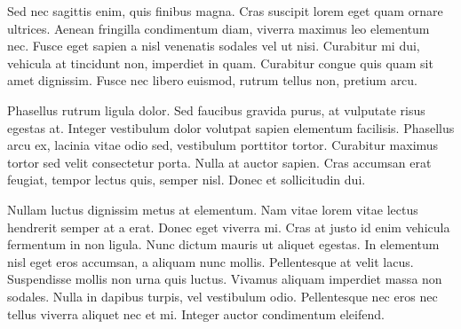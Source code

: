 Sed nec sagittis enim, quis finibus magna. Cras suscipit lorem eget quam ornare ultrices. Aenean fringilla condimentum diam, viverra maximus leo elementum nec. Fusce eget sapien a nisl venenatis sodales vel ut nisi. Curabitur mi dui, vehicula at tincidunt non, imperdiet in quam. Curabitur congue quis quam sit amet dignissim. Fusce nec libero euismod, rutrum tellus non, pretium arcu.

Phasellus rutrum ligula dolor. Sed faucibus gravida purus, at vulputate risus egestas at. Integer vestibulum dolor volutpat sapien elementum facilisis. Phasellus arcu ex, lacinia vitae odio sed, vestibulum porttitor tortor. Curabitur maximus tortor sed velit consectetur porta. Nulla at auctor sapien. Cras accumsan erat feugiat, tempor lectus quis, semper nisl. Donec et sollicitudin dui.

Nullam luctus dignissim metus at elementum. Nam vitae lorem vitae lectus hendrerit semper at a erat. Donec eget viverra mi. Cras at justo id enim vehicula fermentum in non ligula. Nunc dictum mauris ut aliquet egestas. In elementum nisl eget eros accumsan, a aliquam nunc mollis. Pellentesque at velit lacus. Suspendisse mollis non urna quis luctus. Vivamus aliquam imperdiet massa non sodales. Nulla in dapibus turpis, vel vestibulum odio. Pellentesque nec eros nec tellus viverra aliquet nec et mi. Integer auctor condimentum eleifend.






\newpage
\cleardoublepage
{}




